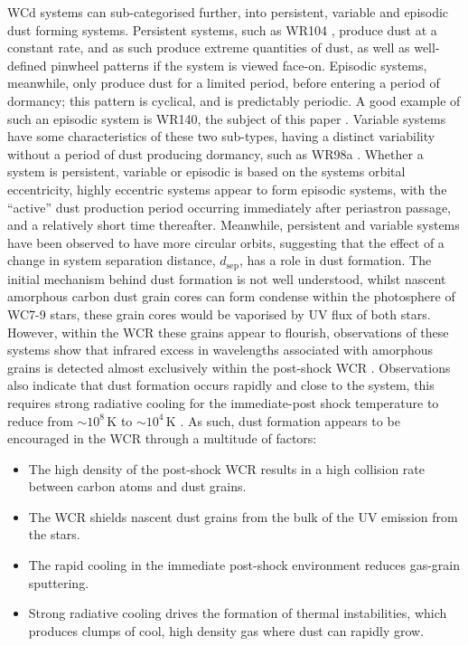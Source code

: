 \documentclass[fleqn,usenatbib]{mnras}
\newcommand{\rms}[1]{\ensuremath{_{\text{#1}}}}
\begin{document}
WCd systems can sub-categorised further, into persistent, variable and episodic dust forming systems.
Persistent systems, such as WR104 \citep{tuthill_dusty_1999}, produce dust at a constant rate, and as such produce extreme quantities of dust, as well as well-defined pinwheel patterns if the system is viewed face-on.
Episodic systems, meanwhile, only produce dust for a limited period, before entering a period of dormancy; this pattern is cyclical, and is predictably periodic.
A good example of such an episodic system is WR140, the subject of this paper \citep{williamsMultifrequencyVariationsWolfrayet1990}.
Variable systems have some characteristics of these two sub-types, having a distinct variability without a period of dust producing dormancy, such as WR98a \citep{monnierPinwheelNebulaWR1999}.
Whether a system is persistent, variable or episodic is based on the systems orbital eccentricity, highly eccentric systems appear to form episodic systems, with the ``active'' dust production period occurring immediately after periastron passage, and a relatively short time thereafter.
Meanwhile, persistent and variable systems have been observed to have more circular orbits, suggesting that the effect of a change in system separation distance, $d\rms{sep}$, has a role in dust formation.
The initial mechanism behind dust formation is not well understood, whilst nascent amorphous carbon dust grain cores can form condense within the photosphere of WC7-9 stars,
these grain cores would be vaporised by UV flux of both stars.
However, within the WCR these grains appear to flourish, observations of these systems show that infrared excess in wavelengths associated with amorphous grains is detected almost exclusively within the post-shock WCR \citep{soulainSPHEREViewWolfRayet2018}.
Observations also indicate that dust formation occurs rapidly and close to the system, this requires strong radiative cooling for the immediate-post shock temperature to reduce from $\sim 10^8 \, \si{\kelvin}$ to $\sim 10^4 \, \si{\kelvin}$
\citep{williamsInfraredPhotometryLatetype1987,williamsMultifrequencyVariationsWolfrayet1990}.
As such, dust formation appears to be encouraged in the WCR through a multitude of factors:

\begin{itemize}
  \item The high density of the post-shock WCR results in a high collision rate between carbon atoms and dust grains.
  \item The WCR shields nascent dust grains from the bulk of the UV emission from the stars.
  \item The rapid cooling in the immediate post-shock environment reduces gas-grain sputtering.
  \item Strong radiative cooling drives the formation of thermal instabilities, which produces clumps of cool, high density gas where dust can rapidly grow.
\end{itemize}
\end{document}
